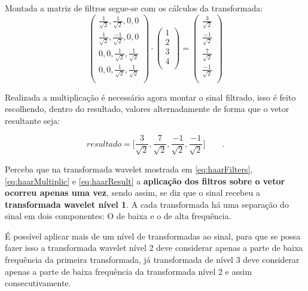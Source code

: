 			\par Montada a matriz de filtros segue-se com os cálculos da transformada:
			\begin{equation}
				\begin{pmatrix}
					\frac{1}{\sqrt{2}}, \frac{1}{\sqrt{2}}, 0, 0\\
					\frac{1}{\sqrt{2}}, \frac{-1}{\sqrt{2}}, 0, 0\\
					0, 0, \frac{1}{\sqrt{2}}, \frac{1}{\sqrt{2}}\\
					0, 0, \frac{1}{\sqrt{2}}, \frac{1}{\sqrt{2}}\\
				\end{pmatrix} 
				\cdot
				\begin{pmatrix}
					1\\
					2\\
					3\\
					4\\
				\end{pmatrix} 
				=
				\begin{pmatrix}
					\frac{3}{\sqrt{2}}\\
					\frac{-1}{\sqrt{2}}\\
					\frac{7}{\sqrt{2}}\\
					\frac{-1}{\sqrt{2}}\\
				\end{pmatrix}
				\label{eq:haarMultiplic}
			\end{equation}
			
			\par Realizada a multiplicação é necessário agora montar o sinal filtrado, isso é feito escolhendo, dentro do resultado, valores alternadamente de forma que o vetor resultante seja:

			\begin{equation}
				resultado = \Big[
				\frac{3}{\sqrt{2}},
				\frac{7}{\sqrt{2}},
				\frac{-1}{\sqrt{2}},
				\frac{-1}{\sqrt{2}}
				\Big]\qquad.
				\label{eq:haarResult}
			\end{equation}
			
			\par Perceba que na transformada wavelet mostrada em \ref{eq:haarFilters}, \ref{eq:haarMultiplic} e \ref{eq:haarResult} a \textbf{aplicação dos filtros sobre  o vetor ocorreu apenas uma vez}, sendo assim, se diz que o sinal recebeu a \textbf{transformada wavelet nível 1}. A cada transformada há uma separação do sinal em dois componentes: O de baixa e o de alta frequência.
			
			\par É possível aplicar mais de um nível de transformadas ao sinal, para que se possa fazer isso a transformada wavelet nível 2 deve considerar apenas a parte de baixa frequência da primeira transformada, já transformada de nível 3 deve considerar apenas a parte de baixa frequência da transformada nível 2 e assim consecutivamente.
			
